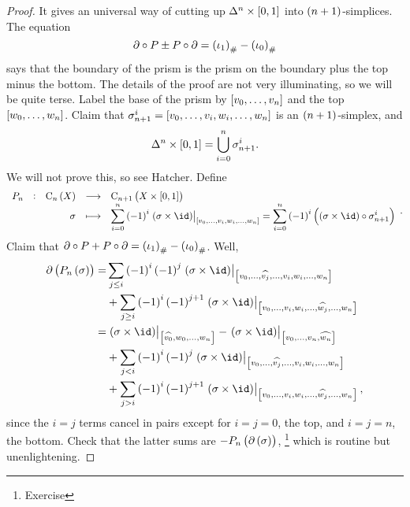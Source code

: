 \begin{proof}
It gives an universal way of cutting up $ \Delta^n \times \sbr{0, 1} $ into $ \br{n + 1} $-simplices. The equation
$$ \da \circ P \pm P \circ \da = \br{\iota_1}_\# - \br{\iota_0}_\# $$
says that the boundary of the prism is the prism on the boundary plus the top minus the bottom. The details of the proof are not very illuminating, so we will be quite terse. Label the base of the prism by $ \sbr{v_0, \dots, v_n} $ and the top $ \sbr{w_0, \dots, w_n} $. Claim that $ \sigma_{n + 1}^i = \sbr{v_0, \dots, v_i, w_i, \dots, w_n} $ is an $ \br{n + 1} $-simplex, and
$$ \Delta^n \times \sbr{0, 1} = \bigcup_{i = 0}^n \sigma_{n + 1}^i. $$
We will not prove this, so see Hatcher. Define
$$ \function[P_n]{\C_n\br{X}}{\C_{n + 1}\br{X \times \sbr{0, 1}}}{\sigma}{\displaystyle\sum_{i = 0}^n \br{-1}^i\eval{\br{\sigma \times \id}}_{\sbr{v_0, \dots, v_i, w_i, \dots, w_n}} = \displaystyle\sum_{i = 0}^n \br{-1}^i\br{\br{\sigma \times \id} \circ \sigma_{n + 1}^i}}. $$
Claim that $ \da \circ P + P \circ \da = \br{\iota_1}_\# - \br{\iota_0}_\# $. Well,
\begin{align*}
\da\br{P_n\br{\sigma}}
= & \sum_{j \le i} \br{-1}^i\br{-1}^j\eval{\br{\sigma \times \id}}_{\sbr{v_0, \dots, \widehat{v_j}, \dots, v_i, w_i, \dots, w_n}} \\
& + \sum_{j \ge i} \br{-1}^i\br{-1}^{j + 1}\eval{\br{\sigma \times \id}}_{\sbr{v_0, \dots, v_i, w_i, \dots, \widehat{w_j}, \dots, w_n}} \\
= & \eval{\br{\sigma \times \id}}_{\sbr{\widehat{v_0}, w_0, \dots, w_n}} - \eval{\br{\sigma \times \id}}_{\sbr{v_0, \dots, v_n, \widehat{w_n}}} \\
& + \sum_{j < i} \br{-1}^i\br{-1}^j\eval{\br{\sigma \times \id}}_{\sbr{v_0, \dots, \widehat{v_j}, \dots, v_i, w_i, \dots, w_n}} \\
& + \sum_{j > i} \br{-1}^i\br{-1}^{j + 1}\eval{\br{\sigma \times \id}}_{\sbr{v_0, \dots, v_i, w_i, \dots, \widehat{w_j}, \dots, w_n}},
\end{align*}
since the $ i = j $ terms cancel in pairs except for $ i = j = 0 $, the top, and $ i = j = n $, the bottom. Check that the latter sums are $ -P_n\br{\da\br{\sigma}} $, \footnote{Exercise} which is routine but unenlightening.
\end{proof}

